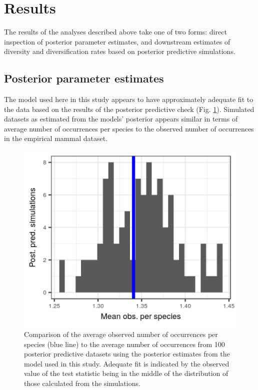 \documentclass[12pt,letterpaper]{article}
\begin{document}
\section*{Results}

The results of the analyses described above take one of two forms: direct inspection of posterior parameter estimates, and downstream estimates of diversity and diversification rates based on posterior predictive simulations.

\subsection*{Posterior parameter estimates}


The model used here in this study appears to have approximately adequate fit to the data based on the results of the posterior predictive check (Fig. \ref{fig:ppc}). Simulated datasets as estimated from the models' posterior appears similar in terms of average number of occurrences per species to the observed number of occurrences in the empirical mammal dataset.
\begin{figure}[ht]
  \includegraphics[width=\textwidth,height=0.3\textheight,keepaspectratio=true]{figure/pred_occ_bd}
  \caption[Posterior predictive check of average occurrence]{Comparison of the average observed number of occurrences per species (blue line) to the average number of occurrences from 100 posterior predictive datasets using the posterior estimates from the model used in this study. Adequate fit is indicated by the observed value of the test statistic being in the middle of the distribution of those calculated from the simulations.}
  \label{fig:ppc}
\end{figure}
\end{document}
